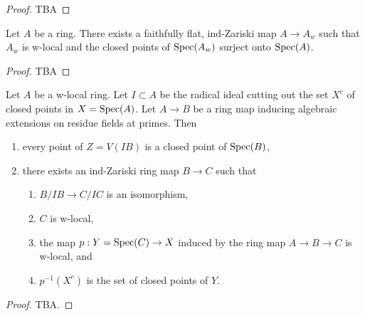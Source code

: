 \begin{proof}
    TBA
\end{proof}

\begin{proposition}
    Let $A$ be a ring. There exists a faithfully flat, ind-Zariski map $A \to A_{w}$ such
    that $A_w$ is w-local and the closed points of $\mathrm{Spec}(A_w)$ surject onto $\mathrm{Spec}(A)$.
    \label{prop:exists-ind-zariski-w-local}
\end{proposition}

\begin{proof}
    TBA
\end{proof}

\begin{lemma}
\label{thm:closed-points-isom-w-local}
Let $A$ be a w-local ring. Let $I \subset A$ be the radical ideal cutting out the set $X^c$ of closed points in $X = \operatorname{Spec} (A)$.
Let $A \to B$ be a ring map inducing algebraic extensions on residue fields at primes. Then
\begin{enumerate}
    \item every point of $Z = V(IB)$ is a closed point of $\operatorname{Spec} (B)$,
    \item there exists an ind-Zariski ring map $B \to C$ such that
    \begin{enumerate}
        \item $B/IB \to C/IC$ is an isomorphism, \label{item:quotinet-isom-closed-points-isom-w-local} %
        \item $C$ is w-local, \label{item:w-local-closed-points-isom-w-local}
        \item the map $p: Y = \operatorname{Spec} (C) \to X$ induced by the ring map $A \to B \to C$ is w-local, and %
        \item $p^{-1}(X^c)$ is the set of closed points of $Y$. \label{item:inverse-image-closed-points-isom-w-local}
    \end{enumerate}
\end{enumerate}
\end{lemma}

\begin{proof}
    TBA.
\end{proof}

